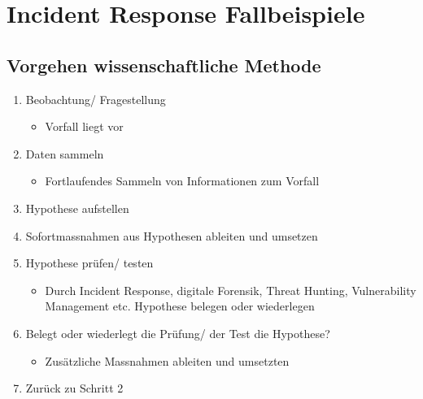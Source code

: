 \section{Incident Response Fallbeispiele}

\subsection{Vorgehen wissenschaftliche Methode}
\begin{enumerate}
    \item Beobachtung/ Fragestellung
    \begin{itemize}
        \item Vorfall liegt vor
    \end{itemize}
    \item Daten sammeln
    \begin{itemize}
        \item Fortlaufendes Sammeln von Informationen zum Vorfall
    \end{itemize}
    \item Hypothese aufstellen
    \item Sofortmassnahmen aus Hypothesen ableiten und umsetzen
    \item Hypothese prüfen/ testen
    \begin{itemize}
        \item Durch Incident Response, digitale Forensik, Threat Hunting, Vulnerability Management etc. Hypothese belegen oder wiederlegen
    \end{itemize}
    \item Belegt oder wiederlegt die Prüfung/ der Test die Hypothese?
    \begin{itemize}
        \item Zusätzliche Massnahmen ableiten und umsetzten
    \end{itemize}
    \item Zurück zu Schritt 2
\end{enumerate}

